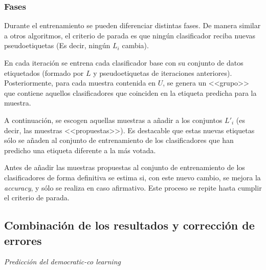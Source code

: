 \subsubsection{Fases}

Durante el entrenamiento se pueden diferenciar distintas fases. De manera similar a otros algoritmos, el criterio de parada es que ningún clasificador reciba nuevas pseudoetiquetas (Es decir, ningún $L_i$ cambia).

En cada iteración se entrena cada clasificador base con su conjunto de datos etiquetados (formado por $L$ y pseudoetiquetas de iteraciones anteriores). Posteriormente, para cada muestra contenida en $U$, se genera un <<grupo>> que contiene aquellos clasificadores que coinciden en la etiqueta predicha para la muestra.

A continuación, se escogen aquellas muestras a añadir a los conjuntos $L'_i$ (es decir, las muestras <<propuestas>>). Es destacable que estas nuevas etiquetas sólo se añaden al conjunto de entrenamiento de los clasificadores que han predicho una etiqueta diferente a la más votada.

Antes de añadir las muestras propuestas al conjunto de entrenamiento de los clasificadores de forma definitiva se estima si, con este nuevo cambio, se mejora la \textit{accuracy}, y sólo se realiza en caso afirmativo. Este proceso se repite hasta cumplir el criterio de parada.

\subsection{Combinación de los resultados y corrección de errores}

\begin{algorithm}
	
	\BlankLine
	
	\caption{\textit{Predicción del \textit{democratic-co learning}}}\label{alg:democratic-co-combination}
\end{algorithm}

